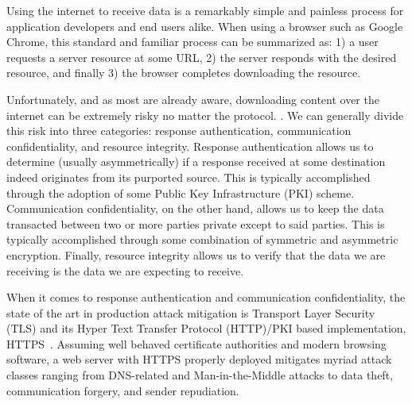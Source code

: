 Using the internet to receive data is a remarkably simple and painless process
for application developers and end users alike. When using a browser such as
Google Chrome, this standard and familiar process can be summarized as: 1) a
user requests a server resource at some URL, 2) the server responds with the
desired resource, and finally 3) the browser completes downloading the resource.

Unfortunately, and as most are already aware, downloading content over
the internet can be extremely risky no matter the protocol.
. We can generally
divide this risk into three categories: response authentication,
communication confidentiality, and resource integrity. Response
authentication allows us to determine (usually asymmetrically) if a
response received at some destination indeed originates from its
purported source. This is typically accomplished through the adoption
of some Public Key Infrastructure (PKI) scheme.  Communication
confidentiality, on the other hand, allows us to keep the data
transacted between two or more parties private except to said parties.
This is typically accomplished through some combination of symmetric
and asymmetric encryption. Finally, resource integrity allows us to
verify that the data we are receiving is the data we are expecting to
receive.

When it comes to response authentication and communication confidentiality, the
state of the art in production attack mitigation is Transport Layer Security
(TLS) and its Hyper Text Transfer Protocol (HTTP)/PKI based implementation,
HTTPS~\cite{TLS1.2, TLS1, TLS0}. Assuming well behaved certificate authorities
and modern browsing software, a web server with HTTPS properly deployed
mitigates myriad attack classes ranging from DNS-related and Man-in-the-Middle
attacks to data theft, communication forgery, and sender repudiation.


